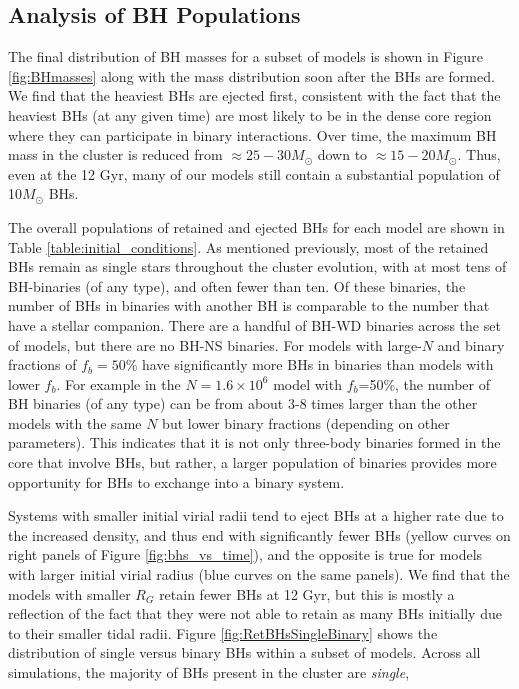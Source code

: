 \documentclass[12pt,preprint]{aastex}
\begin{document}

\subsection{Analysis of BH Populations}

The final distribution of BH masses for  a subset of models is shown in Figure \ref{fig:BHmasses}
along with the mass distribution soon after the BHs are formed. We find that the heaviest BHs
are ejected first, consistent with the fact that the heaviest BHs (at any given time) are most likely
to be in the dense core region where they can participate in binary interactions. Over time,
the maximum BH mass in the cluster is reduced from $\approx 25-30 M_\odot$ down to 
$\approx 15-20 M_\odot$. Thus, even at the 12 Gyr, many of our models still contain a
substantial population of 10$M_\odot$ BHs.

The overall populations of retained and ejected BHs for each model are shown in 
Table \ref{table:initial_conditions}. As mentioned previously, most of the retained BHs
remain as single stars throughout the cluster evolution, with at most
tens of BH-binaries (of any type), and often fewer than ten. Of these binaries, the number
of BHs in binaries with another BH is comparable to the number that have a stellar companion.
There are a handful of BH-WD binaries across the set of models, but there are no BH-NS
binaries. For models with 
large-$N$ and binary fractions of $f_b=50$\% 
have significantly more BHs in binaries than models with lower $f_b$. For example
in the $N= 1.6 \times 10^6$ model with $f_b$=50\%, the number of BH binaries (of any type)
can be from about 3-8 times larger than the other models with the same $N$ but 
lower binary fractions (depending on other parameters). This indicates that it is not 
only three-body binaries formed in the 
core that involve BHs, but rather, a larger population of binaries provides more 
opportunity for BHs to exchange into a binary system.

Systems with smaller initial virial radii tend to eject BHs at a higher rate due to
the increased density, and thus end with significantly fewer
BHs (yellow curves on right panels of Figure \ref{fig:bhs_vs_time}), and the opposite is true for 
models with larger initial virial 
radius (blue curves on the same panels). We find that the models with smaller $R_G$ retain fewer BHs
at 12 Gyr, but this is mostly a reflection of the fact that they were not able to retain as many BHs
initially due to their smaller tidal radii. Figure \ref{fig:RetBHsSingleBinary}
shows the distribution of single versus binary BHs within a subset of models. Across all 
simulations, the majority of BHs present in the cluster are \emph{single}, 
\end{document}
